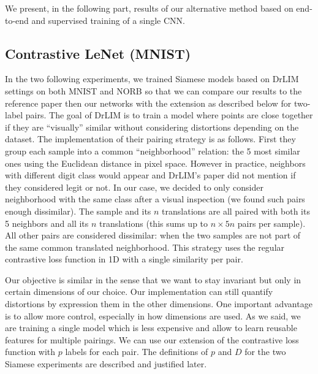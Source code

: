 \documentclass[a4paper,12pt]{report}
\begin{document}
We present, in the following part, results of our alternative method based on end-to-end and supervised training of a single CNN.

\subsection{Contrastive LeNet (MNIST)}
In the two following experiments, we trained Siamese models based on DrLIM settings on both MNIST and NORB so that we can compare our results to the reference paper then our networks with the extension as described below for two-label pairs.
The goal of DrLIM is to train a model where points are close together if they are ``visually'' similar without considering distortions depending on the dataset.
The implementation of their pairing strategy is as follows.
First they group each sample into a common ``neighborhood'' relation: the 5 most similar ones using the Euclidean distance in pixel space.
However in practice, neighbors with different digit class would appear and DrLIM's paper did not mention if they considered legit or not.
In our case, we decided to only consider neighborhood with the same class after a visual inspection (we found such pairs enough dissimilar).
The sample and its $n$ translations are all paired with both its 5 neighbors and all its $n$ translations (this sums up to $n \times 5n$ pairs per sample).
All other pairs are considered dissimilar: when the two samples are not part of the same common translated neighborhood.
This strategy uses the regular contrastive loss function in 1D with a single similarity per pair.

Our objective is similar in the sense that we want to stay invariant but only in certain dimensions of our choice.
Our implementation can still quantify distortions by expression them in the other dimensions.
One important advantage is to allow more control, especially in how dimensions are used.
As we said, we are training a single model which is less expensive and allow to learn reusable features for multiple pairings.
We can use our extension of the contrastive loss function with $p$ labels for each pair.
The definitions of $p$ and $D$ for the two Siamese experiments are described and justified later.
\end{document}
